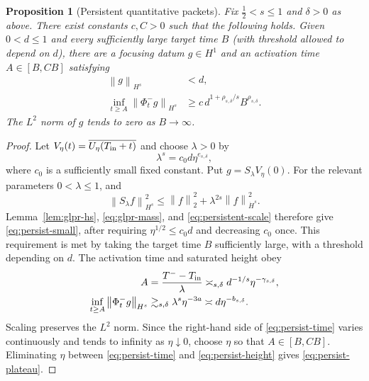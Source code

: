\documentclass[11pt,reqno]{amsart}
\numberwithin{equation}{section}
\newtheorem{proposition}[theorem]{Proposition}
\theoremstyle{remark}
\newcommand{\half}{\frac12}
\newcommand{\norm}[1]{\left\lVert #1\right\rVert}
\newcommand{\flow}[1]{\Phi^{#1}}
\begin{document}
\begin{proposition}[Persistent quantitative packets]\label{prop:persistent}
Fix $\half<s\leq1$ and $\delta>0$ as above.  There exist constants
$c,C>0$ such that the following holds.  Given $0<d\leq1$ and every
sufficiently large target time $B$ (with threshold allowed to depend on
$d$), there are a focusing datum $g\in H^1$
and an activation time $A\in[B,CB]$ satisfying
\begin{align}
 \norm g_{H^s}&<d,\label{eq:persist-small}\\
 \inf_{t\geq A}\norm{\flow-_tg}_{H^s}
 &\geq c\,d^{1+\rho_{s,\delta}/s}B^{\rho_{s,\delta}}.
 \label{eq:persist-plateau}
\end{align}
The $L^2$ norm of $g$ tends to zero as $B\to\infty$.
\end{proposition}

\begin{proof}
Let $V_\eta(t)=\overline{U_\eta(T_{\rm in}+t)}$ and choose
$\lambda>0$ by
\begin{equation}\label{eq:persistent-scale}
 \lambda^s=c_0d\eta^{e_{s,\delta}},
\end{equation}
where $c_0$ is a sufficiently small fixed constant.  Put
$g=S_\lambda V_\eta(0)$.  For the relevant parameters $0<\lambda\leq1$, and
\begin{equation}\label{eq:inhomogeneous-small-scale}
 \norm{S_\lambda f}_{H^s}^2
 \leq \norm f_2^2+\lambda^{2s}\norm f_{\dot H^s}^2.
\end{equation}
Lemma~\ref{lem:glpr-hs}, \eqref{eq:glpr-mass}, and
\eqref{eq:persistent-scale} therefore give \eqref{eq:persist-small}, after
requiring $\eta^{1/2}\leq c_0d$ and decreasing $c_0$ once.  This requirement
is met by taking the target time $B$ sufficiently large, with a threshold
depending on $d$.
The activation time and saturated height obey
\begin{align}
 A&=\frac{T^--T_{\rm in}}\lambda
 \asymp_{s,\delta}d^{-1/s}\eta^{-\gamma_{s,\delta}},
 \label{eq:persist-time}\\
 \inf_{t\geq A}\norm{\flow-_tg}_{H^s}
 &\gtrsim_{s,\delta}
 \lambda^s\eta^{-3a}
 \asymp d\eta^{-b_{s,\delta}}.
 \label{eq:persist-height}
\end{align}
Scaling preserves the $L^2$ norm.  Since the right-hand side of
\eqref{eq:persist-time} varies continuously and tends to infinity as
$\eta\downarrow0$, choose $\eta$ so that $A\in[B,CB]$.  Eliminating $\eta$
between \eqref{eq:persist-time} and \eqref{eq:persist-height} gives
\eqref{eq:persist-plateau}.
\end{proof}
\end{document}
